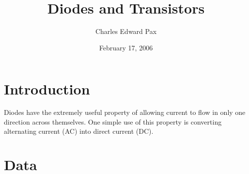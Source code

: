 \documentclass[11pt,onecolumn]{article}
\begin{document}

\title{Diodes and Transistors}

\date{February 17, 2006}

\author{Charles Edward Pax}

\maketitle


\section{Introduction}\label{sec:Introduction}
Diodes have the extremely useful property of allowing current to flow in only one direction across themselves. One simple use of this property is converting alternating current (AC) into direct current (DC).

\section{Data}\label{sec:Data}
\end{document}
